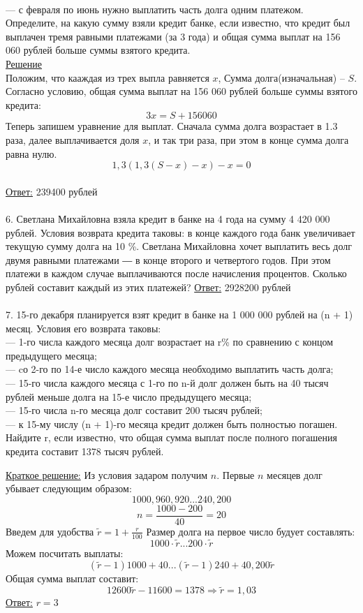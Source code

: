 \documentclass{article}
\begin{document}
\\
— с февраля по июнь нужно выплатить часть долга одним платежом.
\\
Определите, на какую сумму взяли кредит банке, если известно, что кредит был выплачен тремя равными платежами (за 3 года) и общая сумма выплат на 156 060 рублей больше суммы взятого кредита.
\\
\underline{Решение}
\\
Положим, что кааждая из трех выпла равняется $x$, Сумма долга(изначальная) -- $S$. 
\\
Согласно условию, общая сумма выплат на 156 060 рублей больше суммы взятого кредита:
\[ 3x = S + 156060 \]
Теперь запишем уравнение для выплат. Сначала сумма долга возрастает в 1.3 раза, далее выплачивается доля $x$, и так
три раза, при этом в конце сумма долга равна нулю.
\[
    1,3(1,3(S - x) - x) - x = 0
\]
\\
\underline{Ответ:} 239400 рублей
\\ \\
6. Светлана Михайловна взяла кредит в банке на 4 года на сумму 4 420 000 рублей. 
Условия возврата кредита таковы: в конце каждого года банк увеличивает текущую сумму долга на 10 \%. 
Светлана Михайловна хочет выплатить весь долг двумя равными платежами ― в конце второго и четвертого годов. 
При этом платежи в каждом случае выплачиваются после начисления процентов. Сколько рублей составит каждый из этих платежей?
\underline{Ответ:} 2928200 рублей
\\ \\
7. 15-го декабря планируется взят кредит в банке на 1 000 000 рублей на (n + 1) месяц. Условия его возврата таковы:
\\
— 1-го числа каждого месяца долг возрастает на r\% по сравнению с концом предыдущего месяца;
\\
— cо 2-го по 14-е число каждого месяца необходимо выплатить часть долга;
\\
— 15-го числа каждого месяца с 1-го по n-й долг должен быть на 40 тысяч рублей меньше долга на 15-е число предыдущего месяца;
\\
— 15-го числа n-го месяца долг составит 200 тысяч рублей;
\\
— к 15-му числу (n + 1)-го месяца кредит должен быть полностью погашен.
\\
Найдите r, если известно, что общая сумма выплат после полного погашения кредита составит 1378 тысяч рублей.

\underline{Краткое решение:}
Из условия задаром получим $n$. Первые $n$ месяцев долг убывает следующим образом:
\[ 1000, 960, 920...240, 200\]
\[ n = \frac{1000 - 200}{40} = 20\]
Введем для удобства \( \widetilde{r} = 1 + \frac{r}{100} \)
Размер долга на первое число будует составлять:
\[ 1000\cdot \widetilde{r}...200\cdot \widetilde{r}\]
Можем посчитать выплаты:
\[ (\widetilde{r} - 1)1000 + 40...(\widetilde{r} - 1)240 + 40, 200 \widetilde{r} \]
Общая сумма выплат составит:
\[ 12600 \widetilde{r} - 11600 = 1378 \Rightarrow \widetilde{r} = 1,03\]
\underline{Ответ:} \( r = 3\)
\\ \\
\end{document}
